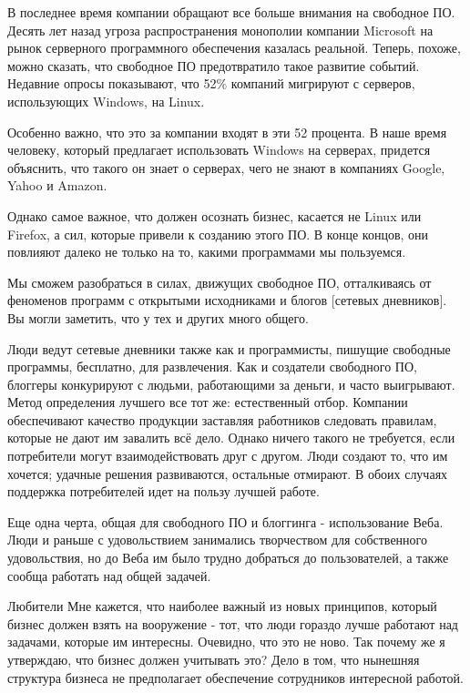 \documentclass[ebook,12pt,oneside,openany]{memoir}
\author{Пол Грэм} \date{}
\begin{document}
\maketitle

В последнее время компании обращают все больше внимания на свободное
ПО. Десять лет назад угроза распространения монополии компании
Microsoft на рынок серверного программного обеспечения казалась
реальной. Теперь, похоже, можно сказать, что свободное ПО
предотвратило такое развитие событий. Недавние опросы показывают, что
52\% компаний мигрируют с серверов, использующих Windows, на Linux.

Особенно важно, что это за компании входят в эти 52 процента. В наше
время человеку, который предлагает использовать Windows на серверах,
придется объяснить, что такого он знает о серверах, чего не знают в
компаниях Google, Yahoo и Amazon.

Однако самое важное, что должен осознать бизнес, касается не Linux или
Firefox, а сил, которые привели к созданию этого ПО. В конце концов,
они повлияют далеко не только на то, какими программами мы пользуемся.

Мы сможем разобраться в силах, движущих свободное ПО, отталкиваясь от
феноменов программ с открытыми исходниками и блогов [сетевых
дневников]. Вы могли заметить, что у тех и других много общего.

Люди ведут сетевые дневники также как и программисты, пишущие
свободные программы, бесплатно, для развлечения. Как и создатели
свободного ПО, блоггеры конкурируют с людьми, работающими за деньги, и
часто выигрывают. Метод определения лучшего все тот же: естественный
отбор. Компании обеспечивают качество продукции заставляя работников
следовать правилам, которые не дают им завалить всё дело. Однако
ничего такого не требуется, если потребители могут взаимодействовать
друг с другом. Люди создают то, что им хочется; удачные решения
развиваются, остальные отмирают. В обоих случаях поддержка
потребителей идет на пользу лучшей работе.

Еще одна черта, общая для свободного ПО и блоггинга - использование
Веба. Люди и раньше с удовольствием занимались творчеством для
собственного удовольствия, но до Веба им было трудно добраться до
пользователей, а также сообща работать над общей задачей.

Любители Мне кажется, что наиболее важный из новых принципов, который
бизнес должен взять на вооружение - тот, что люди гораздо лучше
работают над задачами, которые им интересны. Очевидно, что это не
ново. Так почему же я утверждаю, что бизнес должен учитывать это? Дело
в том, что нынешняя структура бизнеса не предполагает обеспечение
сотрудников интересной работой.
\end{document}
